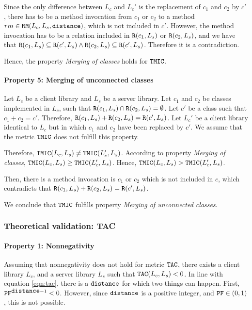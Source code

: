 Since the only difference between $L_c$ and $L_c'$ is the replacement of $c_1$ and $c_2$ by $c'$, there has to be a method invocation from $c_1$ or $c_2$ to a method $rm \in \verb|RM|(L_c,L_s,\verb|distance|)$, which is not included in $c'$. However, the method invocation has to be a relation included in $\verb|R|(c_1, L_s)$ or $\verb|R|(c_2, L_s)$, and we have that $\verb|R|(c_1, L_s) \subseteq \verb|R|(c', L_s) \land \verb|R|(c_2, L_s) \subseteq \verb|R|(c', L_s)$. Therefore it is a contradiction.

Hence, the property \textit{Merging of classes} holds for $\verb|TMIC|$.

\paragraph{Property 5: Merging of unconnected classes}
Let $L_c$ be a client library and $L_s$ be a server library. Let $c_1$ and $c_2$ be classes implemented in $L_c$, such that $\verb|R|(c_1, L_s) \cap \verb|R|(c_2, L_s) = \emptyset$. Let $c'$ be a class such that $c_1 + c_2 = c'$. Therefore, $\verb|R|(c_1, L_s) + \verb|R|(c_2, L_s) = \verb|R|(c', L_s)$. Let $L_c'$ be a client library identical to $L_c$ but in which $c_1$ and $c_2$ have been replaced by $c'$. We assume that the metric $\verb|TMIC|$ does not fulfill this property.

Therefore, $\verb|TMIC|(L_c, L_s) \neq \verb|TMIC|(L_c', L_s)$. According to property \textit{Merging of classes}, $\verb|TMIC|(L_c, L_s) \geq \verb|TMIC|(L_c', L_s)$. Hence, $\verb|TMIC|(L_c, L_s) > \verb|TMIC|(L_c', L_s)$.

Then, there is a method invocation is $c_1$ or $c_2$ which is not included in $c$, which contradicts that $\verb|R|(c_1, L_s) + \verb|R|(c_2, L_s) = \verb|R|(c', L_s)$.

We conclude that $\verb|TMIC|$ fulfills property \textit{Merging of unconnected classes}.

\subsubsection{Theoretical validation: TAC}

\paragraph{Property 1: Nonnegativity}
Assuming that nonnegativity does not hold for metric $\verb|TAC|$, there exists a client library $L_c$, and a server library $L_s$ such that $\verb|TAC|(L_c, L_s) < 0$. In line with equation \ref{eqn:tac}, there is a $\verb|distance|$ for which two things can happen. First, $\verb|PF|^{\verb|distance| - 1} < 0$. However, since $\verb|distance|$ is a positive integer, and $\verb|PF| \in (0,1)$, this is not possible.

